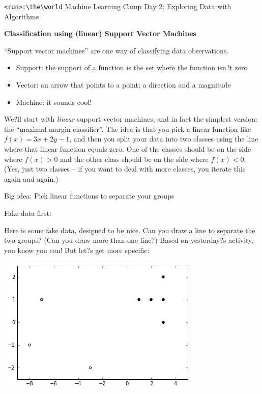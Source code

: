 \documentclass[10pt]{article}
\newcommand{\code}[1]{\colorbox{light-gray}{\texttt{#1}}}
\newcommand{\headerclass}{\code{<run>:\textbackslash the\textbackslash world} Machine Learning Camp}
\newcommand{\headersection}{Day 2: Exploring Data with Algorithms}
\newcommand{\headertitle}{Classification using (linear) Support Vector Machines}
\begin{document}
\headerclass\xspace {} \headersection\\
\begin{center}{ \large \textbf{\headertitle} }\end{center}





``Support vector machines'' are one way of classifying data observations. 
\begin{itemize}
\item Support: the support of a function is the set where the function isn?t zero
\item Vector: an arrow that points to a point; a direction and a magnitude
\item Machine: it sounds cool! 
\end{itemize}
We?ll start with \textit{linear} support vector machines, and in fact the simplest version: the ``maximal margin classifier''. The idea is that you pick a linear function like $f(x) = 3x+2y-1$, and then you split your data into two classes using the line where that linear function equals zero. One of the classes should be on the side where $f(x) > 0$ and the other class should be on the side where $f(x) < 0$. (Yes, just two classes -- if you want to deal with more classes, you iterate this again and again.)
\bigskip
\begin{center}
Big idea: Pick linear functions to separate your groups
\end{center}
\bigskip

Fake data first:

Here is some fake data, designed to be nice. Can you draw a line to separate the two groups? (Can you draw more than one line?) Based on yesterday?s activity, you know you can! But let?s get more specific:
\begin{center}
\includegraphics{TwoClusters.png}
\end{center}
\end{document}

